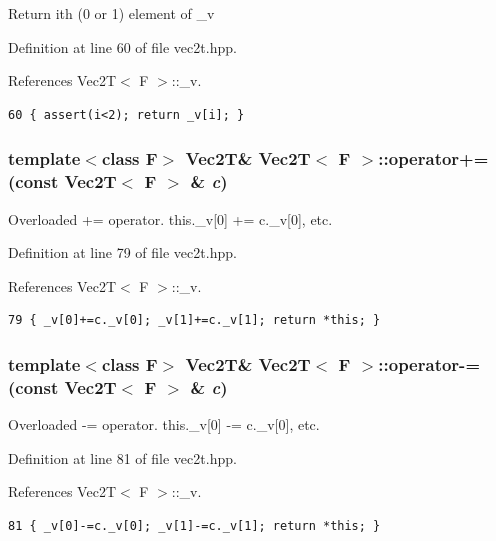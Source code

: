 Return ith (0 or 1) element of \_\-v 

Definition at line 60 of file vec2t.hpp.

References Vec2T$<$ F $>$::\_\-v.

\footnotesize\begin{verbatim}60 { assert(i<2); return _v[i]; }
\end{verbatim}\normalsize 


\subsubsection{\setlength{\rightskip}{0pt plus 5cm}template$<$class F$>$ {\bf Vec2T}\& {\bf Vec2T}$<$ F $>$::operator+= (const {\bf Vec2T}$<$ F $>$ \& {\em c})\hspace{0.3cm}{\tt  [inline]}}\label{classVec2T_6932583e3aa9e5a22015adcd00230afb_6932583e3aa9e5a22015adcd00230afb}


Overloaded += operator. this.\_\-v[0] += c.\_\-v[0], etc. 

Definition at line 79 of file vec2t.hpp.

References Vec2T$<$ F $>$::\_\-v.

\footnotesize\begin{verbatim}79 { _v[0]+=c._v[0]; _v[1]+=c._v[1]; return *this; }
\end{verbatim}\normalsize 


\subsubsection{\setlength{\rightskip}{0pt plus 5cm}template$<$class F$>$ {\bf Vec2T}\& {\bf Vec2T}$<$ F $>$::operator-= (const {\bf Vec2T}$<$ F $>$ \& {\em c})\hspace{0.3cm}{\tt  [inline]}}\label{classVec2T_d4f32965803fd69e2448219b0bac712b_d4f32965803fd69e2448219b0bac712b}


Overloaded -= operator. this.\_\-v[0] -= c.\_\-v[0], etc. 

Definition at line 81 of file vec2t.hpp.

References Vec2T$<$ F $>$::\_\-v.

\footnotesize\begin{verbatim}81 { _v[0]-=c._v[0]; _v[1]-=c._v[1]; return *this; }
\end{verbatim}\normalsize 


